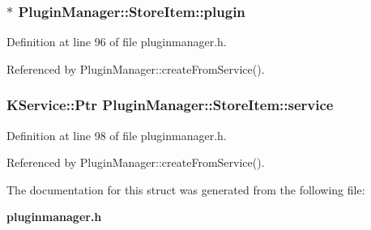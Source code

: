 \subsubsection{$\ast$ {\bf Plugin\-Manager::Store\-Item::plugin}}\label{structPluginManager_1_1StoreItem_PluginManager_1_1StoreItemo0}




Definition at line 96 of file pluginmanager.h.

Referenced by Plugin\-Manager::create\-From\-Service().
\subsubsection{\setlength{\rightskip}{0pt plus 5cm}KService::Ptr {\bf Plugin\-Manager::Store\-Item::service}}\label{structPluginManager_1_1StoreItem_PluginManager_1_1StoreItemo2}




Definition at line 98 of file pluginmanager.h.

Referenced by Plugin\-Manager::create\-From\-Service().

The documentation for this struct was generated from the following file:\begin{CompactItemize}
\item 
{\bf pluginmanager.h}\end{CompactItemize}
